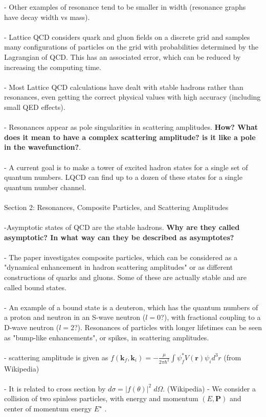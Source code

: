 - Other examples of resonance tend to be smaller in width (resonance graphs have decay width vs mass).\\\\
- Lattice QCD considers quark and gluon fields on a discrete grid and samples many configurations of particles on the grid with probabilities determined by the Lagrangian of QCD. This has an associated error, which can be reduced by increasing the computing time. \\\\
- Most Lattice QCD calculations have dealt with stable hadrons rather than resonances, even getting the correct physical values with high accuracy (including small QED effects).\\\\
- Resonances appear as pole singularities in scattering amplitudes. \textbf{How? What does it mean to have a complex scattering amplitude? is it like a pole in the wavefunction?}.\\\\
- A current goal is to make a tower of excited hadron states for a single set of quantum numbers. LQCD can find up to a dozen of these states for a single quantum number channel.\\\\
Section 2: Resonances, Composite Particles, and Scattering Amplitudes\\\\
-Asymptotic states of QCD are the stable hadrons. \textbf{Why are they called asymptotic? In what way can they be described as asymptotes?}\\\\
- The paper investigates composite particles, which can be considered as a "dynamical enhancement in hadron scattering amplitudes" or as different constructions of quarks and gluons. Some of these are actually stable and are called bound states.\\\\
- An example of a bound state is a deuteron, which has the quantum numbers of a proton and neutron in an S-wave neutron ($l = 0$?), with fractional coupling to a D-wave neutron ($l = 2$?). Resonances of particles with longer lifetimes can be seen as "bump-like enhancements", or spikes,  in scattering amplitudes.\\\\
- scattering amplitude is given as ${\displaystyle f(\mathbf {k} _{f},\mathbf {k} _{i})=-{\frac {\mu }{2\pi \hbar ^{2}}}\int \psi _{f}^{*}V(\mathbf {r} )\psi _{i}d^{3}r}$ (from Wikipedia)\\\\
- It is related to cross section by ${\displaystyle d\sigma =|f(\theta )|^{2}\;d\Omega .}$ (Wikipedia)
- We consider a collision of two spinless particles, with energy and momentum $(E, \textbf{P})$ and center of momentum energy $E^\star$ .\\\\

